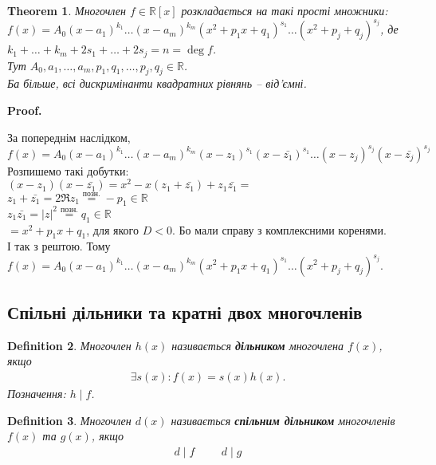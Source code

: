 \documentclass[a4paper, 10pt]{extarticle}
\makeatletter
\def\qed{$\blacksquare$}
\def\qed{$\blacksquare$}
\theoremstyle{theoremdd}
\newtheorem{theorem}{Theorem}[subsection]
\theoremstyle{theoremdd}
\newtheorem{definition}[theorem]{Definition}
\theoremstyle{theoremdd}
\theoremstyle{theoremdd}
\theoremstyle{theoremdd}
\theoremstyle{theoremdd}
\theoremstyle{theoremdd}
\theoremstyle{theoremdd}
\renewenvironment{proof}[1][Proof.\\]{\par
\pushQED{\hfill \qed}%
\normalfont \topsep6\p@\@plus6\p@\relax
\trivlist
\item\relax
{\bfseries
#1\@addpunct{.}}\hspace\labelsep\ignorespaces
}{%
\popQED\endtrivlist\@endpefalse
}
\makeatother
\begin{document}
\begin{theorem}
Многочлен $f \in \mathbb{R}[x]$ розкладається на такі прості множники:\\
$f(x) = A_0 (x-a_1)^{k_1} \dots (x-a_m)^{k_m} (x^2+p_1x+q_1)^{s_1} \dots (x^2+p_j+q_j)^{s_j}$, де \\
$k_1 + \dots + k_m + 2s_1 + \dots + 2s_j = n = \deg f$.\\
Тут $A_0, a_1,\dots,a_m, p_1,q_1,\dots,p_j,q_j \in \mathbb{R}$.\\
Ба більше, всі дискримінанти квадратних рівнянь -- від'ємні.
\end{theorem}

\begin{proof}
За попереднім наслідком,\\
$f(x) = A_0(x-a_1)^{k_1} \dots (x-a_m)^{k_m} (x-z_1)^{s_1} (x-\bar{z_1})^{s_1} \dots (x-z_j)^{s_j} (x-\bar{z_j})^{s_j}$\\
Розпишемо такі добутки:\\
$(x-z_1)(x-\bar{z_1}) = x^2 - x(z_1 +\bar{z_1}) + z_1 \bar{z_1} \boxed{=}$\\
$z_1 + \bar{z_1} = 2 \Re z_1 \overset{\textrm{позн.}}{=} -p_1 \in \mathbb{R}$\\
$z_1 \bar{z_1} = |z|^2 \overset{\textrm{позн.}}{=} q_1 \in \mathbb{R}$\\
$\boxed{=} x^2 + p_1x + q_1$, для якого $D < 0$. Бо мали справу з комплексними коренями.\\
І так з рештою. Тому\\
$f(x) = A_0 (x-a_1)^{k_1} \dots (x-a_m)^{k_m} (x^2+p_1x+q_1)^{s_1} \dots (x^2+p_j+q_j)^{s_j}$.
\end{proof}

\subsection{Спільні дільники та кратні двох многочленів}
\begin{definition}
Многочлен $h(x)$ називається \textbf{дільником} многочлена $f(x)$, якщо
\begin{align*}
\exists s(x): f(x) = s(x) h(x).
\end{align*}
Позначення: $h \mid f$.
\end{definition}

\begin{definition}
Многочлен $d(x)$ називається \textbf{спільним дільником} многочленів $f(x)$ та $g(x)$, якщо
\begin{align*}
d \mid f \hspace{1cm} d \mid g
\end{align*}
\end{definition}
\end{document}
